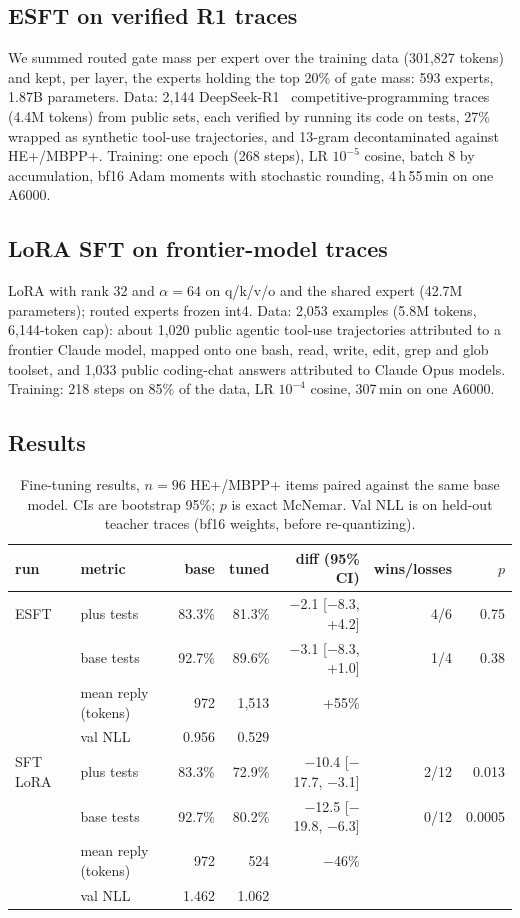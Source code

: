 \documentclass[11pt]{article}
\begin{document}
\subsection{ESFT on verified R1 traces}

We summed routed gate mass per expert over the training data (301,827 tokens) and kept, per layer, the experts holding
the top 20\% of gate mass: 593 experts, 1.87B parameters. Data: 2,144 DeepSeek-R1~\citep{deepseekr1} competitive-programming
traces (4.4M tokens) from public sets, each verified by running its code on tests, 27\% wrapped as synthetic tool-use
trajectories, and 13-gram decontaminated against HE+/MBPP+. Training: one epoch (268 steps), LR $10^{-5}$ cosine, batch
8 by accumulation, bf16 Adam moments with stochastic rounding, 4\,h\,55\,min on one A6000.

\subsection{LoRA SFT on frontier-model traces}

LoRA with rank 32 and $\alpha{=}64$ on q/k/v/o and the shared expert (42.7M parameters); routed experts frozen int4.
Data: 2,053 examples (5.8M tokens, 6,144-token cap): about 1,020 public agentic tool-use trajectories attributed to a
frontier Claude model, mapped onto one bash, read, write, edit, grep and glob toolset, and 1,033 public coding-chat answers
attributed to Claude Opus models. Training: 218 steps on 85\% of the data, LR $10^{-4}$ cosine, 307\,min on one A6000.

\subsection{Results}

\begin{table}[t]
\centering
\caption{Fine-tuning results, $n{=}96$ HE+/MBPP+ items paired against the same base model. CIs are bootstrap 95\%;
$p$ is exact McNemar. Val NLL is on held-out teacher traces (bf16 weights, before re-quantizing).}
\label{tab:ft}
\small
\begin{tabular}{llrrrrr}
\toprule
run & metric & base & tuned & diff (95\% CI) & wins/losses & $p$ \\
\midrule
ESFT & plus tests & 83.3\% & 81.3\% & $-$2.1 [$-$8.3, +4.2] & 4/6 & 0.75 \\
  & base tests & 92.7\% & 89.6\% & $-$3.1 [$-$8.3, +1.0] & 1/4 & 0.38 \\
  & mean reply (tokens) & 972 & 1,513 & +55\% & & \\
  & val NLL & 0.956 & 0.529 & & & \\
\midrule
SFT LoRA & plus tests & 83.3\% & 72.9\% & $-$10.4 [$-$17.7, $-$3.1] & 2/12 & 0.013 \\
  & base tests & 92.7\% & 80.2\% & $-$12.5 [$-$19.8, $-$6.3] & 0/12 & 0.0005 \\
  & mean reply (tokens) & 972 & 524 & $-$46\% & & \\
  & val NLL & 1.462 & 1.062 & & & \\
\bottomrule
\end{tabular}
\end{table}
\end{document}
